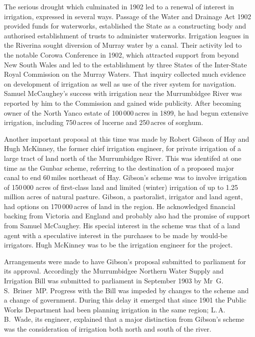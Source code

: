 The serious drought which culminated in 1902 led to a
renewal of interest in irrigation, expressed in several ways.  Passage
of the Water and Drainage Act 1902  provided funds for waterworks, established the
State as a constructing body and authorised establishment of trusts to
administer waterworks.  Irrigation leagues in the Riverina sought
diversion of Murray water by a canal.  Their activity led to the
notable Corowa Conference in 1902, which attracted support from beyond
New South Wales and led to the establishment by three States of the
Inter-State Royal Commission on the Murray Waters.  That inquiry
collected much evidence on development of irrigation as well as use of
the river system for navigation. Samuel McCaughey's success with
irrigation near the Murrumbidgee River was reported by him to the
Commission and gained wide publicity. After becoming owner of the
North Yanco  estate of 100\,000\,acres in
1899, he had begun extensive irrigation, including 750\,acres of
lucerne and 250\,acres of sorghum.


Another important proposal at this time was made by Robert Gibson
 of Hay and Hugh McKinney,  the
former chief irrigation engineer, for private irrigation of a large
tract of land north of the Murrumbidgee
River.  This was identifed at one time as
the Gunbar scheme, referring to the destination of a proposed major
canal to end 60\,miles northeast of Hay.  Gibson's scheme was to
involve irrigation of 150\,000 acres of first-class land and limited
(winter) irrigation of up to 1.25 million acres of natural pasture.
Gibson, a pastoralist, irrigator and land agent, had options on
170\,000\,acres of land in the region.  He acknowledged
financial backing from Victoria and
England and probably also had the promise of support
from Samuel McCaughey.  His special interest in
the scheme was that of a land agent with a speculative interest in the
purchases to be made by would-be irrigators.  Hugh McKinney was to be
the irrigation engineer for the project.

Arrangements were made to have Gibson's proposal submitted to
parliament for its approval.  Accordingly the Murrumbidgee Northern
Water Supply and Irrigation Bill was submitted to parliament in
September 1903 by Mr~G.\,S.~Briner~MP.  Progress
with the Bill was impeded by changes to the scheme and a change of
government. During this delay it emerged that since 1901 the Public
Works Department had been planning irrigation in the same region;
L.\,A.\,B.~Wade,  its engineer, explained that
a major distinction from Gibson's scheme was the consideration of
irrigation both north and south of the river.

